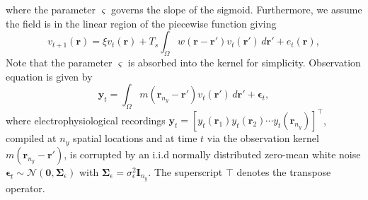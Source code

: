 \documentclass[journal,a4paper]{IEEEtran}
\begin{document}
where the parameter $\varsigma$ governs the slope of the sigmoid. Furthermore, we assume the field is in the linear region of the piecewise function giving
\begin{equation}\label{eq:DiscreteTimeModel} 
	v_{t+1}\left(\mathbf{r}\right) = 
	\xi v_t\left(\mathbf{r}\right) + 
	T_s \int_\Omega { 
	    w\left(\mathbf{r}-\mathbf{r'}\right)
	    v_t\left(\mathbf{r}'\right) 
	\, d\mathbf{r}'} 
	+ e_t\left(\mathbf{r}\right), 
\end{equation}
Note that the parameter $\varsigma$ is absorbed into the kernel for simplicity. Observation equation is given by 
\begin{equation}\label{eq:ObservationEquation}
	\mathbf y_t = \int_{\Omega} { m\left(\mathbf{r}_{n_y}-\mathbf{r}'\right) v_t\left(\mathbf{r}'\right) \, d\mathbf{r}'} + \boldsymbol\epsilon_t, 
\end{equation}
where electrophysiological recordings $\mathbf{y}_{t}=[y_t(\mathbf{r}_1) y_t(\mathbf{r}_2)\cdots y_t(\mathbf{r}_{n_y})]^\top$, compiled at $n_{y}$ spatial locations and at time $t$ via the observation kernel  $m\left(\mathbf{r}_{n_y}-\mathbf{r}'\right)$, is corrupted by an i.i.d normally distributed zero-mean white noise $\boldsymbol{\epsilon}_{t}\sim \mathcal{N}\left(\mathbf{0},\mathbf{\Sigma}_{\epsilon}\right)$ with $\mathbf{\Sigma}_{\epsilon}=\sigma_{\epsilon}^2\mathbf I_{n_y} $. The superscript $\top$ denotes the transpose operator.
\end{document}
